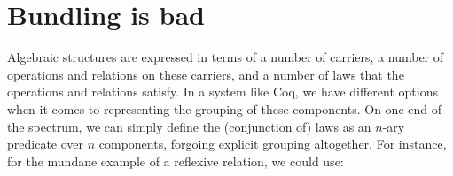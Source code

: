 \documentclass[a4paper,10pt,runningheads]{llncs}
\begin{document}
% 

\section{Bundling is bad}\label{bundling}

Algebraic structures are expressed in terms of a number of carriers, a number of operations and relations on these carriers, and a number of laws that the operations and relations satisfy. In a system like Coq, we have different options when it comes to representing the grouping of these components. On one end of the spectrum, we can simply define the (conjunction of) laws as an $n$-ary predicate over $n$ components, forgoing explicit grouping altogether. For instance, for the mundane example of a reflexive relation, we could use:
\end{document}

